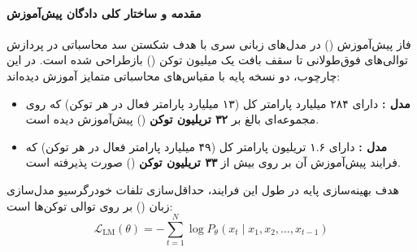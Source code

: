 \item {}

\paragraph*{مقدمه و ساختار کلی دادگان پیش‌آموزش}
فاز پیش‌آموزش () در مدل‌های زبانی سری  با هدف شکستن سد محاسباتی در پردازش توالی‌های فوق‌طولانی تا سقف بافت یک میلیون توکن () بازطراحی شده است. در این چارچوب، دو نسخه پایه با مقیاس‌های محاسباتی متمایز آموزش دیده‌اند:
\begin{itemize}
    \item \textbf{مدل :} دارای ۲۸۴ میلیارد پارامتر کل (۱۳ میلیارد پارامتر فعال در هر توکن) که روی مجموعه‌ای بالغ بر \textbf{۳۲ تریلیون توکن} () پیش‌آموزش دیده است.
    \item \textbf{مدل :} دارای ۱.۶ تریلیون پارامتر کل (۴۹ میلیارد پارامتر فعال در هر توکن) که فرایند پیش‌آموزش آن بر روی بیش از \textbf{۳۳ تریلیون توکن} () صورت پذیرفته است.
\end{itemize}

هدف بهینه‌سازی پایه در طول این فرایند، حداقل‌سازی تلفات خودرگرسیو مدل‌سازی زبان () بر روی توالی توکن‌ها است:
\begin{equation}
    \mathcal{L}_{\text{LM}}(\theta) = - \sum_{t=1}^{N} \log P_\theta(x_t \mid x_1, x_2, \dots, x_{t-1})
\end{equation}


